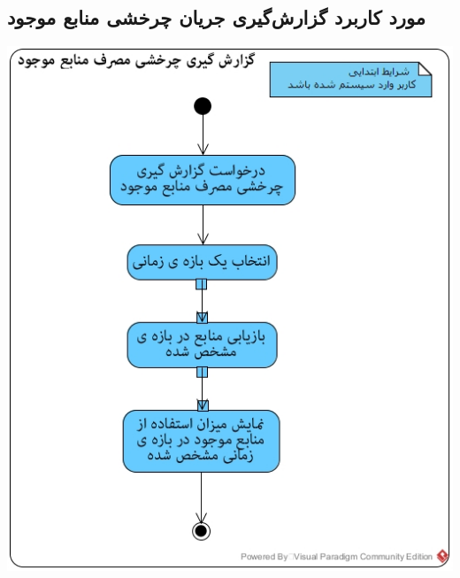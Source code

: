 \documentclass{article}
\begin{document}
\subsection*{مورد کاربرد گزارش‌گیری جریان چرخشی منابع موجود}
\vspace{2cm}
\begin{center}
\includegraphics[width=\textwidth]{ActivityDiagrams/41.jpg}
\end{center}

\newpage
\vspace{2cm}
\end{document}
